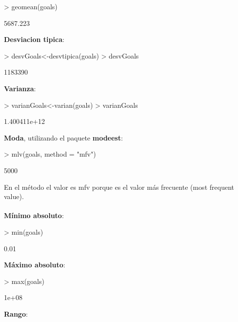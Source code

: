 \documentclass [a4paper] {article}
\begin{document}
\begin{Schunk}
\begin{Sinput}
> geomean(goals)
\end{Sinput}
\begin{Soutput}
[1] 5687.223
\end{Soutput}
\end{Schunk}
\textbf{Desviacion tipica}:

\begin{Schunk}
\begin{Sinput}
> desvGoals<-desvtipica(goals)
> desvGoals
\end{Sinput}
\begin{Soutput}
[1] 1183390
\end{Soutput}
\end{Schunk}
\textbf{Varianza}:

\begin{Schunk}
\begin{Sinput}
> varianGoals<-varian(goals)
> varianGoals
\end{Sinput}
\begin{Soutput}
[1] 1.400411e+12
\end{Soutput}
\end{Schunk}
\textbf{Moda}, utilizando el paquete \textbf{modeest}:

\begin{Schunk}
\begin{Sinput}
> mlv(goals, method = "mfv")
\end{Sinput}
\begin{Soutput}
[1] 5000
\end{Soutput}
\end{Schunk}
En el método el valor es mfv porque es el valor más frecuente (most frequent value).\\\\
\textbf{Mínimo absoluto}:

\begin{Schunk}
\begin{Sinput}
> min(goals)
\end{Sinput}
\begin{Soutput}
[1] 0.01
\end{Soutput}
\end{Schunk}
\textbf{Máximo absoluto}:

\begin{Schunk}
\begin{Sinput}
> max(goals)
\end{Sinput}
\begin{Soutput}
[1] 1e+08
\end{Soutput}
\end{Schunk}
\textbf{Rango}:
\end{document}
